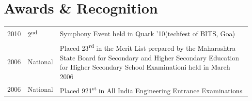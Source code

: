 \documentclass[letterpaper]{deedy-resume} %
\begin{document}
\begin{minipage}[t]{0.66\textwidth}
\sectionspace %


\section{Awards \& Recognition}

\begin{tabular}{rll}
2010 & 2\textsuperscript{nd} & Symphony Event held in Quark '10(techfest of BITS, Goa)\\
2006 & National & Placed 23\textsuperscript{rd} in the Merit List prepared by the Maharashtra State Board for Secondary and Higher Secondary Education for Higher Secondary School Examinationi held in March 2006\\
2006 & National & Placed 921\textsuperscript{st} in All India Engineering Entrance Examinations \\
\end{tabular}

\sectionspace %


\end{minipage} %
\end{document}
